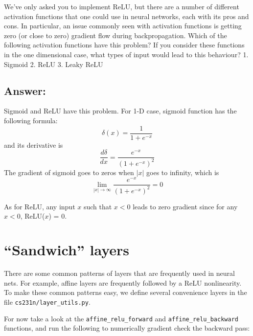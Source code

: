 \documentclass[11pt]{article}
\begin{document}
We've only asked you to implement ReLU, but there are a number of
different activation functions that one could use in neural networks,
each with its pros and cons. In particular, an issue commonly seen with
activation functions is getting zero (or close to zero) gradient flow
during backpropagation. Which of the following activation functions have
this problem? If you consider these functions in the one dimensional
case, what types of input would lead to this behaviour? 1. Sigmoid 2.
ReLU 3. Leaky ReLU

\hypertarget{answer}{%
\subsection{Answer:}\label{answer}}

Sigmoid and ReLU have this problem. For 1-D case, sigmoid function has
the following formula: \[\delta(x)=\frac{1}{1+e^{-x}}\] and its
derivative is \[\frac{d\delta}{d x} = \frac{e^{-x}}{(1+e^{-x})^2}\] The
gradient of sigmoid goes to zeros when \(|x|\) goes to infinity, which
is \[\lim_{|x|\to \infty}\frac{e^{-x}}{(1+e^{-x})^2} = 0 \]

As for ReLU, any input \(x\) such that \(x<0\) leads to zero gradient
since for any \(x<0\), ReLU(\(x\)) = 0.

    \hypertarget{sandwich-layers}{%
\section{``Sandwich'' layers}\label{sandwich-layers}}

There are some common patterns of layers that are frequently used in
neural nets. For example, affine layers are frequently followed by a
ReLU nonlinearity. To make these common patterns easy, we define several
convenience layers in the file \texttt{cs231n/layer\_utils.py}.

For now take a look at the \texttt{affine\_relu\_forward} and
\texttt{affine\_relu\_backward} functions, and run the following to
numerically gradient check the backward pass:
\end{document}
